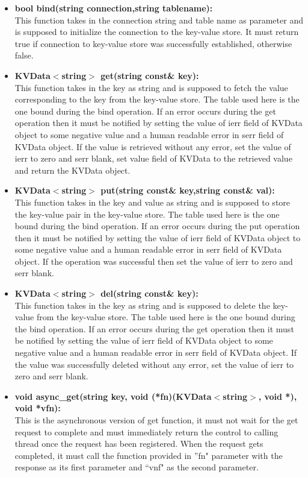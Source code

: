 \documentclass[11pt]{article}
\begin{document}
\begin{itemize}

\item \textbf{bool bind(string connection,string tablename):}\\
This function takes in the connection string and table name as parameter and is supposed to initialize the connection to the key-value store. It must return true if connection to key-value store was successfully established, otherwise false.

\item \textbf{KVData$<$string$>$ get(string const\& key):}\\
This function takes in the key as string and is supposed to fetch the value corresponding to the key from the key-value store. The table used here is the one bound during the bind operation. If an error occurs during the get operation then it must be notified by setting the value of ierr field of KVData object to some negative value and a human readable error in serr field of KVData object. If the value is retrieved without any error, set the value of ierr to zero and serr blank, set value field of KVData to the retrieved value and return the KVData object.

\item \textbf{KVData$<$string$>$ put(string const\& key,string const\& val):}\\
This function takes in the key and value as string and is supposed to store the key-value pair in the key-value store. The table used here is the one bound during the bind operation. If an error occurs during the put operation then it must be notified by setting the value of ierr field of KVData object to some negative value and a human readable error in serr field of KVData object. If the operation was successful then set the value of ierr to zero and serr blank.

\item \textbf{KVData$<$string$>$ del(string const\& key):}\\
This function takes in the key as string and is supposed to delete the key-value from the key-value store. The table used here is the one bound during the bind operation. If an error occurs during the get operation then it must be notified by setting the value of ierr field of KVData object to some negative value and a human readable error in serr field of KVData object. If the value was successfully deleted without any error, set the value of ierr to zero and serr blank.

\item \textbf{void async\_get(string key, void (*fn)(KVData$<$string$>$, void *), void *vfn):}\\
This is the asynchronous version of get function, it must not wait for the get request to complete and must immediately return the control to calling thread once the request has been registered. When the request gets completed, it must call the function provided in ''fn" parameter with the response as its first parameter and ``vnf" as the second parameter.



\end{itemize}
\end{document}
